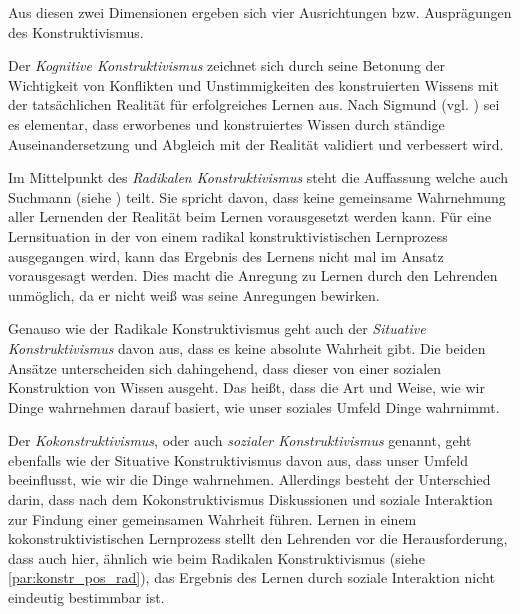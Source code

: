 Aus diesen zwei Dimensionen ergeben sich vier Ausrichtungen bzw. Ausprägungen des Konstruktivismus. 

Der \emph{Kognitive Konstruktivismus} zeichnet sich durch seine Betonung der Wichtigkeit von Konflikten und Unstimmigkeiten des konstruierten Wissens mit der tatsächlichen Realität für erfolgreiches Lernen aus. Nach Sigmund (vgl. \cite{Tobias.1991}) sei es elementar, dass erworbenes und konstruiertes Wissen durch ständige Auseinandersetzung und Abgleich mit der Realität validiert und verbessert wird. 

Im Mittelpunkt des \emph{Radikalen Konstruktivismus} \label{par:konstr_pos_rad} steht die Auffassung welche auch Suchmann (siehe \cite{Suchman.1987}) teilt. Sie spricht davon, dass keine gemeinsame Wahrnehmung aller Lernenden der Realität beim Lernen vorausgesetzt werden kann. Für eine Lernsituation in der von einem radikal konstruktivistischen Lernprozess ausgegangen wird, kann das Ergebnis des Lernens nicht mal im Ansatz vorausgesagt werden. Dies macht die Anregung zu Lernen durch den Lehrenden unmöglich, da er nicht weiß was seine Anregungen bewirken. \cite{Anderson.1999} %

Genauso wie der Radikale Konstruktivismus geht auch der \emph{Situative Konstruktivismus} davon aus, dass es keine absolute Wahrheit gibt. \cite{Anderson.1999} Die beiden Ansätze unterscheiden sich dahingehend, dass dieser von einer sozialen Konstruktion von Wissen ausgeht. Das heißt, dass die Art und Weise, wie wir Dinge wahrnehmen darauf basiert, wie unser soziales Umfeld Dinge wahrnimmt. \cite{Jonassen.1992} %

Der \emph{Kokonstruktivismus}, oder auch \emph{sozialer Konstruktivismus} genannt, geht ebenfalls wie der Situative Konstruktivismus davon aus, dass unser Umfeld beeinflusst, wie wir die Dinge wahrnehmen. Allerdings besteht der Unterschied darin, dass nach dem Kokonstruktivismus Diskussionen und soziale Interaktion zur Findung einer gemeinsamen Wahrheit führen. \cite{Bereiter.1994} Lernen in einem kokonstruktivistischen Lernprozess stellt den Lehrenden vor die Herausforderung, dass auch hier, ähnlich wie beim Radikalen Konstruktivismus (siehe \ref{par:konstr_pos_rad}), das Ergebnis des Lernen durch soziale Interaktion nicht eindeutig bestimmbar ist. \cite{Anderson.1999} %

